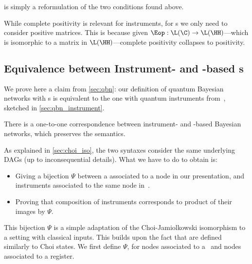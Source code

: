  is simply a reformulation of the two conditions found above.

\begin{remark}
While complete positivity is relevant for instruments, for \qfactor s we only need to consider positive matrices.
This is because given $\Eop:\L(\C)\to\L(\HH)$---which is isomorphic to a matrix in $\L(\HH)$---complete positivity collapses to positivity.
\end{remark}

\subsection{Equivalence between Instrument- and \Qfactor-based \qqbn s}
\label{app:equivalence_qbns_proof}

We prove here a claim from \cref{sec:qbn}: our definition of quantum Bayesian networks with \qfactor s is equivalent to the one with quantum instruments from~\cite{GBN2014}, sketched in \cref{sec:qbn_instrument}.

\begin{proposition}
\label{lem:bij_2_QBNs}
There is a one-to-one correspondence between instrument- and \qfactor-based Bayesian networks, which preserves the semantics.
\end{proposition}

As explained in \cref{sec:choi_iso}, the two syntaxes consider the same underlying DAGs (up to inconsequential details).
What we have to do to obtain  is:
\begin{itemize}
\item
Giving a bijection $\Psi$ between a \qCPT associated to a node in our presentation, and instruments associated to the same node in~\cite{GBN2014}.
\item
Proving that composition of instruments corresponds to product of their images by $\Psi$.
\end{itemize}

This bijection $\Psi$ is a simple adaptation of the Choi-Jamiolkowski isomorphism to a setting with classical inputs.
This builds upon the fact that \qCPTs are defined similarly to Choi states.
We first define $\Psi$, for nodes associated to a \rv\ and nodes associated to a register.

